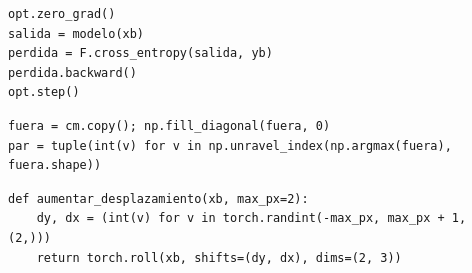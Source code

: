 \documentclass[11pt,letterpaper]{article}
\begin{document}
\begin{lstlisting}[caption={TODO 3, los cinco pasos de una iteración}]
opt.zero_grad()
salida = modelo(xb)
perdida = F.cross_entropy(salida, yb)
perdida.backward()
opt.step()
\end{lstlisting}

\begin{lstlisting}[caption={TODO 4, par más confundido}]
fuera = cm.copy(); np.fill_diagonal(fuera, 0)
par = tuple(int(v) for v in np.unravel_index(np.argmax(fuera), fuera.shape))
\end{lstlisting}

\begin{lstlisting}[caption={TODO 5, desplazamiento aleatorio del lote}]
def aumentar_desplazamiento(xb, max_px=2):
    dy, dx = (int(v) for v in torch.randint(-max_px, max_px + 1, (2,)))
    return torch.roll(xb, shifts=(dy, dx), dims=(2, 3))
\end{lstlisting}
\end{document}
